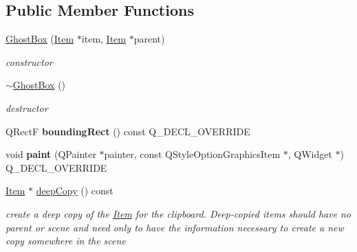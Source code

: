 \subsection*{Public Member Functions}
\begin{DoxyCompactItemize}
\item 
\hyperlink{classprim_1_1GhostBox_a53ca4c643d84fd75c8b5469a8d5789d1}{Ghost\+Box} (\hyperlink{classprim_1_1Item}{Item} $\ast$item, \hyperlink{classprim_1_1Item}{Item} $\ast$parent)\hypertarget{classprim_1_1GhostBox_a53ca4c643d84fd75c8b5469a8d5789d1}{}\label{classprim_1_1GhostBox_a53ca4c643d84fd75c8b5469a8d5789d1}

\begin{DoxyCompactList}\small\item\em constructor \end{DoxyCompactList}\item 
\hyperlink{classprim_1_1GhostBox_aa1b26dcd2637e429bd9f0ae2b2947930}{$\sim$\+Ghost\+Box} ()\hypertarget{classprim_1_1GhostBox_aa1b26dcd2637e429bd9f0ae2b2947930}{}\label{classprim_1_1GhostBox_aa1b26dcd2637e429bd9f0ae2b2947930}

\begin{DoxyCompactList}\small\item\em destructor \end{DoxyCompactList}\item 
Q\+RectF {\bfseries bounding\+Rect} () const Q\+\_\+\+D\+E\+C\+L\+\_\+\+O\+V\+E\+R\+R\+I\+DE\hypertarget{classprim_1_1GhostBox_a63bdb5fc445b3b7887d4eb985046ab4a}{}\label{classprim_1_1GhostBox_a63bdb5fc445b3b7887d4eb985046ab4a}

\item 
void {\bfseries paint} (Q\+Painter $\ast$painter, const Q\+Style\+Option\+Graphics\+Item $\ast$, Q\+Widget $\ast$) Q\+\_\+\+D\+E\+C\+L\+\_\+\+O\+V\+E\+R\+R\+I\+DE\hypertarget{classprim_1_1GhostBox_a0dd5d2a098f9d2f691e69fb4f6ca70f4}{}\label{classprim_1_1GhostBox_a0dd5d2a098f9d2f691e69fb4f6ca70f4}

\item 
\hyperlink{classprim_1_1Item}{Item} $\ast$ \hyperlink{classprim_1_1GhostBox_a6395c270d96456bb625ba7e5f5173478}{deep\+Copy} () const \hypertarget{classprim_1_1GhostBox_a6395c270d96456bb625ba7e5f5173478}{}\label{classprim_1_1GhostBox_a6395c270d96456bb625ba7e5f5173478}

\begin{DoxyCompactList}\small\item\em create a deep copy of the \hyperlink{classprim_1_1Item}{Item} for the clipboard. Deep-\/copied items should have no parent or scene and need only to have the information necessary to create a new copy somewhere in the scene \end{DoxyCompactList}\end{DoxyCompactItemize}
